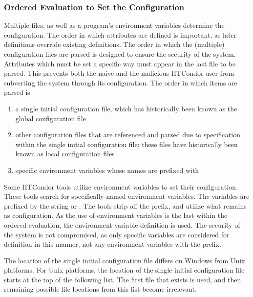 \subsubsection{\label{sec:Ordering-Config-File}Ordered Evaluation to
Set the Configuration} 

Multiple files, as well as a program's environment variables
determine the configuration.
The order in which attributes are defined is important, as later
definitions override existing definitions.
The order in which the (multiple) configuration files are parsed 
is designed to ensure the security of the system.
Attributes which must be set a specific way 
must appear in the last file to be parsed.
This prevents both the naive and the malicious HTCondor user 
from subverting the system through its configuration.
The order in which items are parsed is
\begin{enumerate}
\item a single initial configuration file, which has historically
been known as the global configuration file
\item other configuration files that are referenced and parsed due 
to specification within the single initial configuration file;
these files have historically been known as local configuration files
\item specific environment variables whose names are
prefixed with 
\end{enumerate}


Some HTCondor tools utilize environment variables to set their
configuration.
These tools search for specifically-named environment variables.
The variables are prefixed by the string 
or .
The tools strip off the prefix, and utilize what remains
as configuration.
As the use of environment variables is the last within
the ordered evaluation, 
the environment variable definition is used.
The security of the system is not compromised,
as only specific variables are considered for definition
in this manner, not any environment variables with
the  prefix.

The location of the single initial configuration file differs on
Windows from Unix platforms. 
For Unix platforms, 
the location of the single initial configuration file starts at 
the top of the following list.
The first file that exists is used,
and then remaining possible file locations from this list become irrelevant.

